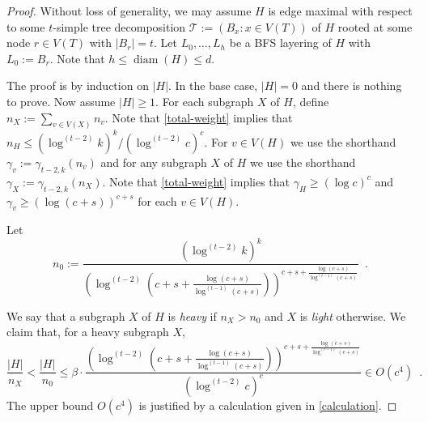 \documentclass[kpfonts]{patmorin}
\DeclareMathOperator{\diam}{diam}
\theoremstyle{named}
\begin{document}
\begin{proof}
    Without loss of generality, we may assume $H$ is edge maximal with respect to some $t$-simple tree decomposition $\mathcal{T}:=(B_x:x\in V(T))$ of $H$ rooted at some node $r\in V(T)$ with $|B_r|=t$.  Let $L_0,\ldots,L_h$ be a BFS layering of $H$ with $L_0:=B_r$.  Note that $h\le\diam(H)\le d$.

    The proof is by induction on $|H|$.  In the base case, $|H|=0$ and there is nothing to prove.
    Now assume $|H|\ge 1$.  For each subgraph $X$ of $H$, define
    $
        n_{X}:=\sum_{v\in V(X)} n_v
    $.
    Note that \cref{total-weight} implies that $n_H\le(\log^{(t-2)} k)^k/(\log^{(t-2)}c)^c$.  For $v\in V(H)$ we use the shorthand $\gamma_v:=\gamma_{t-2,k}(n_v)$ and for any subgraph $X$ of $H$ we use the shorthand $\gamma_X := \gamma_{t-2,k}(n_X)$.  Note that \cref{total-weight} implies that $\gamma_H \ge (\log c)^c$ and $\gamma_v\ge(\log(c+s))^{c+s}$ for each $v\in V(H)$.

    Let
    \begin{equation}
        n_0 := \frac{(\log^{(t-2)} k)^k}{\left(\log^{(t-2)}\left(c+s+\tfrac{\log(c+s)}{\log^{(t-1)}(c+s)}\right)\right)^{c+s+\tfrac{\log(c+s)}{\log^{(t-1)}(c+s)}}} \enspace . \label{heavy-def}
    \end{equation}

    We say that a subgraph $X$ of $H$ is \emph{heavy} if $n_X>n_0$ and $X$ is \emph{light} otherwise.  We claim that, for a heavy subgraph $X$,
    \begin{equation}
        \frac{|H|}{n_X} < \frac{|H|}{n_0}
        \le \beta\cdot \frac{\left(\log^{(t-2)}\left(c+s+\tfrac{\log(c+s)}{\log^{(t-1)}(c+s)}\right)\right)^{c+s+\tfrac{\log(c+s)}{\log^{(t-1)}(c+s)}}}{(\log^{(t-2)} c)^c}
         \in O\left(c^4\right)
    \enspace.
    \end{equation}
    The upper bound $O(c^4)$ is justified by a calculation given in \cref{calculation}.


\end{proof}
\end{document}
